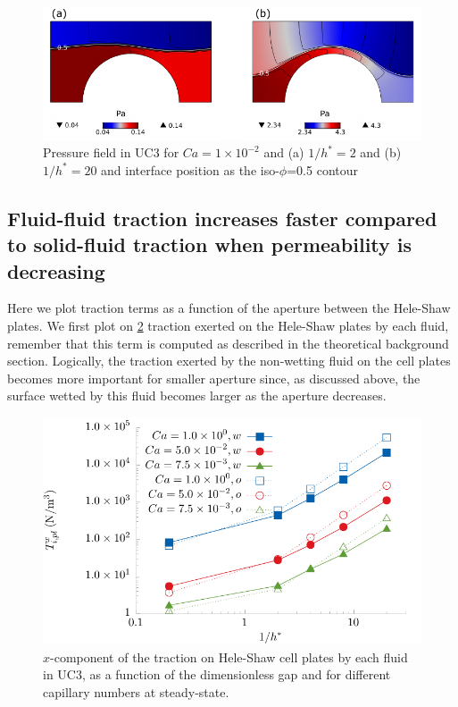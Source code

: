 \documentclass[]{article}
\begin{document}
\begin{figure}
\hypertarget{fig:pFieldCa001}{%
\centering
\includegraphics{figures/pdf/pFieldCa001.pdf}
\caption{Pressure field in UC3 for \(Ca=1 \times 10^{-2}\) and (a)
\(1/h^*=2\) and (b) \(1/h^*=20\) and interface position as the
iso-\(\phi\)=0.5 contour}\label{fig:pFieldCa001}
}
\end{figure}

\hypertarget{fluid-fluid-traction-increases-faster-compared-to-solid-fluid-traction-when-permeability-is-decreasing}{%
\subsection{Fluid-fluid traction increases faster compared to
solid-fluid traction when permeability is
decreasing}\label{fluid-fluid-traction-increases-faster-compared-to-solid-fluid-traction-when-permeability-is-decreasing}}

Here we plot traction terms as a function of the aperture between the
Hele-Shaw plates. We first plot on \cref{fig:drag_plates} traction
exerted on the Hele-Shaw plates by each fluid, remember that this term
is computed as described in the theoretical background section.
Logically, the traction exerted by the non-wetting fluid on the cell
plates becomes more important for smaller aperture since, as discussed
above, the surface wetted by this fluid becomes larger as the aperture
decreases.

\begin{figure}
\hypertarget{fig:drag_plates}{%
\centering
\includegraphics{figures/pdf/drag_plates.pdf}
\caption{\(x\)-component of the traction on Hele-Shaw cell plates by
each fluid in UC3, as a function of the dimensionless gap and for
different capillary numbers at steady-state.}\label{fig:drag_plates}
}
\end{figure}
\end{document}
